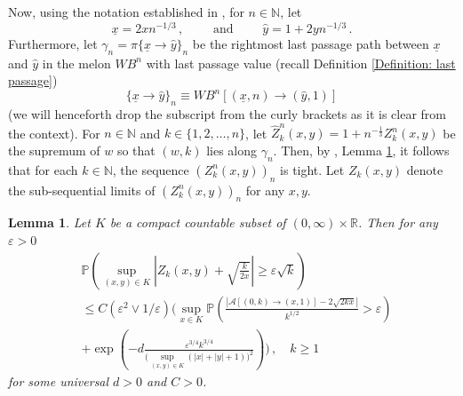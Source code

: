 \documentclass[11pt, reqno]{amsart}
\numberwithin{equation}{section}
\newcounter{dummy} \numberwithin{dummy}{section}
\newtheorem{lemma}[dummy]{Lemma}
\newcommand{\N}{\ensuremath{\mathbb{N}}}
\newcommand{\R}{\ensuremath{\mathbb{R}}}
\newcommand{\PP}{\ensuremath{\mathbb{P}}}
\begin{document}
    Now, using the notation established in \cite{DOV}, for $n\in \N$, let
\begin{equation*}\underline{x}=2xn^{-1/3}\,,\qquad \mbox{ and } \qquad \hat{y}=1+2yn^{-1/3}\,.\end{equation*}
Furthermore, let $\gamma_n = \pi\{\underline{x}\to \hat{y}\}_n$ be the rightmost last passage path between $\underline{x}$ and $\hat{y}$ in the melon $W B^n$ with last passage value (recall Definition \eqref{Definition: last passage})
\[
\{\underline{x}\to \hat{y}\}_n \equiv WB^n[(\underline{x}, n)\to (\hat{y}, 1)]\]
(we will henceforth drop the subscript from the curly brackets as it is clear from the context).
For $n\in \N$ and $k\in \{1,2,\ldots, n\}$, let $\hat{Z}^n_k(x,y) = 1+n^{-\frac{1}{3}}Z_k^n(x,y)$ be the supremum of $w$ so that $(w,k)$ lies along $\gamma_n$. Then, by \cite{DOV}, Lemma \ref{lemma: jump times parabola conc}, it follows that for each $k\in \N$, the sequence $(Z^n_k(x,y))_n$ is tight. Let $Z_k(x,y)$ denote the sub-sequential limits of $(Z^n_k(x,y))_n$ for any $x,y$.

\begin{lemma}\label{lemma: jump times parabola conc}
Let $K$ be a compact countable subset of $(0, \infty) \times \R$. Then for any $\varepsilon > 0$
\begin{align*}
\label{eq: xyKxyK}
& \PP\left(
    \sup_{(x,y)\in K} \left| Z_k(x, y) + \sqrt{\frac{k}{2x}} \right| \ge \varepsilon \sqrt{k}
\right) \\
& \le C (\varepsilon^2 \lor 1/\varepsilon) \Biggl(
    \sup_{x\in K} \PP \left(
        \frac{\left|\mathcal{A}[ (0, k) \rightarrow (x,1) ] - 2\sqrt{2kx} \right|}{k^{1/2}} > \varepsilon
    \right)\\
& + \exp\left(
        - d \frac{
            \varepsilon^{3/4} k^{3/4}
        }{
            \bigl(\sup_{(x,y)\in K} (|x| + |y| + 1)\bigr)^2
        }
    \right)
\Biggr) \,, \quad k \ge 1
\end{align*}
for some universal $d>0$ and $C>0$.
\end{lemma}
\end{document}
